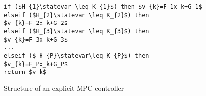 \begin{figure}[t]
\begin{lstlisting}[mathescape=true,frame=lines,basicstyle=\small\ttfamily,morekeywords={if, then, elseif, return}]
if ($H_{1}\statevar \leq K_{1}$) then $v_{k}=F_1x_k+G_1$
elseif ($H_{2}\statevar \leq K_{2}$) then $v_{k}=F_2x_k+G_2$
elseif ($H_{3}\statevar \leq K_{3}$) then $v_{k}=F_3x_k+G_3$
...
elseif ($ H_{P}\statevar\leq K_{P}$) then $v_{k}=F_Px_k+G_P$
return $v_k$
\end{lstlisting}
\caption{Structure of an explicit MPC controller}
\label{lst:caseof}
\end{figure}

